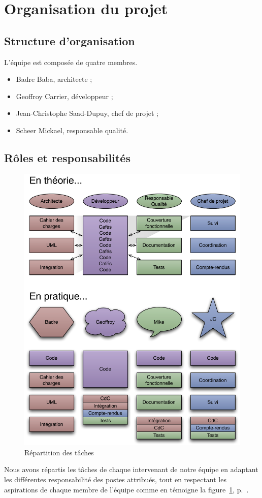 
\section{Organisation du projet}
\subsection{Structure d’organisation}
L'équipe est composée de quatre membres.
\begin{itemize}
	\item Badre Baba, architecte ;
	\item Geoffroy Carrier, développeur ;
	\item Jean-Christophe Saad-Dupuy, chef de projet ;
	\item Scheer Mickael, responsable qualité.
\end{itemize}

\subsection{Rôles et responsabilités}
\begin{figure}[thbp]
	\centering
		\includegraphics[width=15cm]{../diagrammes/repartition_taches.pdf}
	\caption{Répartition des tâches}
	\label{fig:repartition}
\end{figure}

Nous avons répartis les tâches de chaque intervenant de notre équipe en adaptant les différentes responsabilité des postes attribués, tout en respectant les aspirations de chaque membre de l'équipe comme en témoigne la figure~\ref{fig:repartition},
p.~\pageref{fig:repartition}.